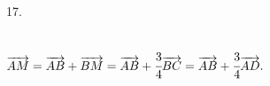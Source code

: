 17. \begin{figure}[ht!]
\end{figure}\\
$\overrightarrow{AM}=\overrightarrow{AB}+\overrightarrow{BM}=\overrightarrow{AB}+\cfrac{3}{4}\overrightarrow{BC}=
\overrightarrow{AB}+\cfrac{3}{4}\overrightarrow{AD}.$\\

